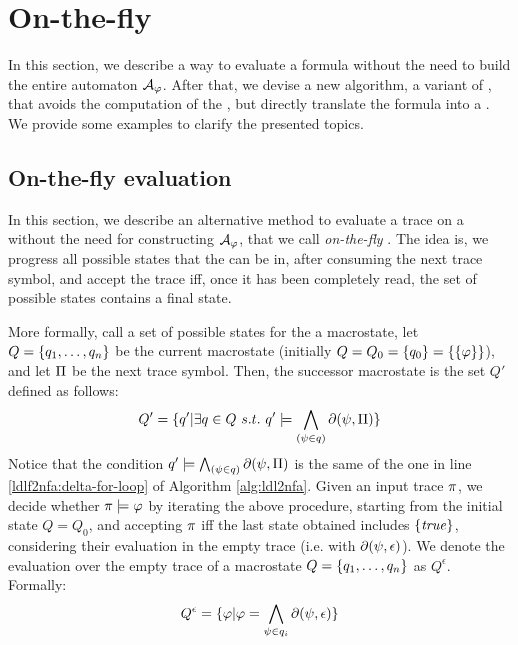 \section{On-the-fly \DFA}
In this section, we describe a way to evaluate a \LLf formula without the need to build the entire automaton $\mathcal{A}_\varphi$. After that, we devise a new algorithm, a variant of \LDLfToNFA, that avoids the computation of the \NFA, but directly translate the formula into a \DFA. We provide some examples to clarify the presented topics.

\subsection{On-the-fly \LLf evaluation}\label{sect:on-the-fly-dfa}
In this section, we describe an alternative method to evaluate a trace on a \DFA without the need for constructing $\mathcal{A}_\varphi$, that we call \emph{on-the-fly} \citep{AAAI1817342}. The idea is, we progress all possible states that the \NFA can be in, after consuming the next trace symbol, and accept the trace iff, once it has been completely read, the set of possible states contains a final state.

More formally, call a set of possible
states for the \NFA a macrostate, let $Q = \{q_1, \dots, q_n\}$ be the current macrostate (initially $Q = Q_0 = \{q_0\} = \{\{\varphi\}\}$), and
let $\Pi$ be the next trace symbol. Then, the successor macrostate is the set $Q'$ defined as follows: 
\begin{equation}\label{eq:on-the-fly-progression-rule}
Q' = \{q' | \exists q \in Q\ s.t.\ q' \models \bigwedge_{(\psi \in q)} \partial(\psi, \Pi)\}
\end{equation} Notice that the condition $q' \models \bigwedge_{(\psi \in q)} \partial(\psi, \Pi)$ is the same of the one in line \ref{ldlf2nfa:delta-for-loop} of Algorithm \ref{alg:ldl2nfa}.
Given an input trace $\pi$, we decide whether $\pi \models \varphi$ by iterating
the above procedure, starting from the initial state $Q = Q_0$,
and accepting $\pi$ iff the last state obtained includes $\{\mathit{true}\}$, considering their evaluation in the empty trace (i.e. with $\partial\lparen \psi, \epsilon\rparen$). We denote the evaluation over the empty trace of a macrostate $Q = \{q_1, \dots, q_n\}$ as $Q^\epsilon$. Formally:
\begin{equation}\label{eq:macro-state-epsilon}
Q^\epsilon = \{\varphi | \varphi = \bigwedge_{\psi\in q_i} \partial\lparen \psi, \epsilon\rparen\}
\end{equation}

